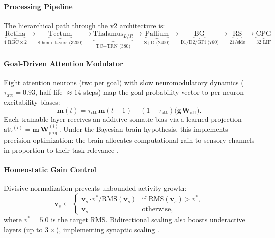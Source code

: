 \documentclass[12pt]{article}
\begin{document}
\paragraph{Processing Pipeline}

The hierarchical path through the v2 architecture is:
\begin{equation}\label{eq:pipeline}
  \underbrace{\text{Retina}}_{\text{4 RGC}\times 2}
  \xrightarrow{}
  \underbrace{\text{Tectum}}_{\text{8 hemi. layers (3200)}}
  \xrightarrow{}
  \underbrace{\text{Thalamus}_{L/R}}_{\text{TC+TRN (380)}}
  \xrightarrow{}
  \underbrace{\text{Pallium}}_{\text{S+D (2400)}}
  \xrightarrow{}
  \underbrace{\text{BG}}_{\text{D1/D2/GPi (760)}}
  \xrightarrow{}
  \underbrace{\text{RS}}_{\text{21/side}}
  \xrightarrow{}
  \underbrace{\text{CPG}}_{\text{32 LIF}}
\end{equation}

\paragraph{Goal-Driven Attention Modulator}

Eight attention neurons (two per goal) with slow neuromodulatory
dynamics ($\tau_\text{att} = 0.93$, half-life $\approx 14$ steps)
map the goal probability vector to per-neuron excitability biases:
\begin{equation}\label{eq:attention}
  \mathbf{m}(t) = \tau_\text{att}\,\mathbf{m}(t{-}1)
    + (1 - \tau_\text{att})\bigl(\mathbf{g}\,\mathbf{W}_\text{att}\bigr).
\end{equation}
Each trainable layer receives an additive somatic bias via a learned
projection $\text{att}^{(l)} = \mathbf{m}\,\mathbf{W}_\text{proj}^{(l)}$.
Under the Bayesian brain hypothesis, this implements precision
optimization: the brain allocates computational gain to sensory
channels in proportion to their task-relevance
\citep{feldman2010}.

\paragraph{Homeostatic Gain Control}

Divisive normalization prevents unbounded activity growth:
\begin{equation}\label{eq:gain_control}
  \mathbf{v}_s \leftarrow
  \begin{cases}
    \mathbf{v}_s \cdot v^*/\text{RMS}(\mathbf{v}_s)
      & \text{if } \text{RMS}(\mathbf{v}_s) > v^*, \\
    \mathbf{v}_s & \text{otherwise},
  \end{cases}
\end{equation}
where $v^* = 5.0$ is the target RMS.
Bidirectional scaling also boosts underactive layers (up to $3\times$),
implementing synaptic scaling \citep{turrigiano2004,turrigiano2008}.
\end{document}
